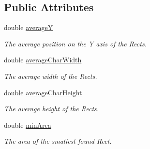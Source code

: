 \subsection*{Public Attributes}
\begin{DoxyCompactItemize}
\item 
\mbox{\label{structfilter_1_1algos_1_1_i_d_plate_1_1_line_data_a118538e641ee7bb9eb840c3f1808def1}} 
double \hyperlink{structfilter_1_1algos_1_1_i_d_plate_1_1_line_data_a118538e641ee7bb9eb840c3f1808def1}{averageY}
\begin{DoxyCompactList}\small\item\em The average position on the Y axis of the Rects. \end{DoxyCompactList}\item 
\mbox{\label{structfilter_1_1algos_1_1_i_d_plate_1_1_line_data_a8e1c5201e974a31d4e22ea3636fb6e33}} 
double \hyperlink{structfilter_1_1algos_1_1_i_d_plate_1_1_line_data_a8e1c5201e974a31d4e22ea3636fb6e33}{average\+Char\+Width}
\begin{DoxyCompactList}\small\item\em The average width of the Rects. \end{DoxyCompactList}\item 
\mbox{\label{structfilter_1_1algos_1_1_i_d_plate_1_1_line_data_a3c44958900b0a68c6053415cdd688b0d}} 
double \hyperlink{structfilter_1_1algos_1_1_i_d_plate_1_1_line_data_a3c44958900b0a68c6053415cdd688b0d}{average\+Char\+Height}
\begin{DoxyCompactList}\small\item\em The average height of the Rects. \end{DoxyCompactList}\item 
\mbox{\label{structfilter_1_1algos_1_1_i_d_plate_1_1_line_data_aa3408ca5252584f2c6ea41d7ec958b2d}} 
double \hyperlink{structfilter_1_1algos_1_1_i_d_plate_1_1_line_data_aa3408ca5252584f2c6ea41d7ec958b2d}{min\+Area}
\begin{DoxyCompactList}\small\item\em The area of the smallest found Rect. \end{DoxyCompactList}\item 

\end{DoxyCompactItemize}
